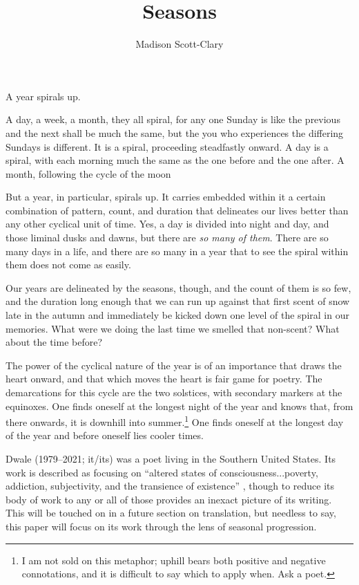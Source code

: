 \documentclass{memoir}
\title{Seasons}
\author{Madison Scott-Clary}
\begin{document}
\maketitle

A year spirals up.

A day, a week, a month, they all spiral, for any one Sunday is like the previous and the next shall be much the same, but the you who experiences the differing Sundays is different. It is a spiral, proceeding steadfastly onward. A day is a spiral, with each morning much the same as the one before and the one after. A month, following the cycle of the moon

But a year, in particular, spirals up. It carries embedded within it a certain combination of pattern, count, and duration that delineates our lives better than any other cyclical unit of time. Yes, a day is divided into night and day, and those liminal dusks and dawns, but there are \emph{so many of them}. There are so many days in a life, and there are so many in a year that to see the spiral within them does not come as easily.

Our years are delineated by the seasons, though, and the count of them is so few, and the duration long enough that we can run up against that first scent of snow late in the autumn and immediately be kicked down one level of the spiral in our memories. What were we doing the last time we smelled that non-scent? What about the time before?

The power of the cyclical nature of the year is of an importance that draws the heart onward, and that which moves the heart is fair game for poetry. The demarcations for this cycle are the two solstices, with secondary markers at the equinoxes. One finds oneself at the longest night of the year and knows that, from there onwards, it is downhill into summer.\footnote{I am not sold on this metaphor; uphill bears both positive and negative connotations, and it is difficult to say which to apply when. Ask a poet.} One finds oneself at the longest day of the year and before oneself lies cooler times.

Dwale (1979--2021; it/its) was a poet living in the Southern United States. Its work is described as focusing on ``altered states of consciousness...poverty, addiction, subjectivity, and the transience of existence'' \parencite{dwale}, though to reduce its body of work to any or all of those provides an inexact picture of its writing. This will be touched on in a future section on translation, but needless to say, this paper will focus on its work through the lens of seasonal progression. 
\end{document}
